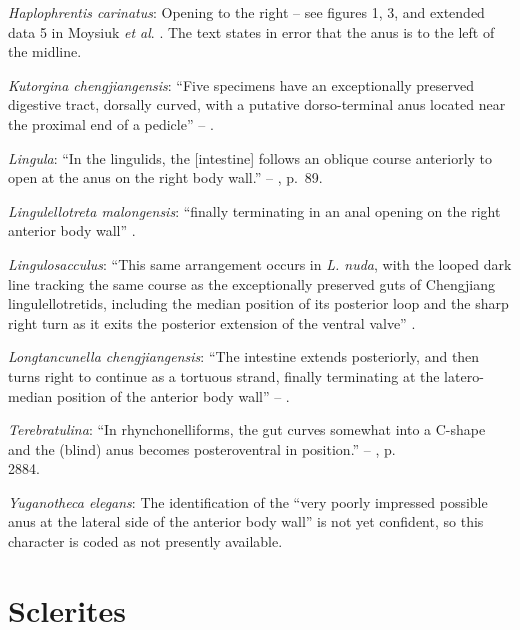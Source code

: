 \documentclass[openany]{book}
\theoremstyle{definition}
\theoremstyle{definition}
\theoremstyle{definition}
\theoremstyle{remark}
\begin{document}
\hypertarget{Haplophrentis_carinatus-coding-62}{}
\emph{Haplophrentis carinatus}: Opening to the right -- see figures 1,
3, and extended data 5 in Moysiuk \emph{et al}.
\citeyearpar{Moysiuk2017Hyolithsare}. The text states in error that the
anus is to the left of the midline.

\hypertarget{Kutorgina_chengjiangensis-coding-62}{}
\emph{Kutorgina chengjiangensis}: ``Five specimens have an exceptionally
preserved digestive tract, dorsally curved, with a putative
dorso-terminal anus located near the proximal end of a pedicle'' --
\citet{Zhang2007Rhynchonelliformeanbrachiopods}.

\hypertarget{Lingula-coding-62}{}
\emph{Lingula}: ``In the lingulids, the {[}intestine{]} follows an
oblique course anteriorly to open at the anus on the right body wall.''
-- \citet{Williams1997Introduction}, p.~89.

\hypertarget{Lingulellotreta_malongensis-coding-62}{}
\emph{Lingulellotreta malongensis}: ``finally terminating in an anal
opening on the right anterior body wall'' \citep[p.66]{Zhang2007Noteon}.

\hypertarget{Lingulosacculus-coding-62}{}
\emph{Lingulosacculus}: ``This same arrangement occurs in \emph{L.
nuda}, with the looped dark line tracking the same course as the
exceptionally preserved guts of Chengjiang lingulellotretids, including
the median position of its posterior loop and the sharp right turn as it
exits the posterior extension of the ventral valve''
\citep[p.310]{Balthasar2009EarlyCambrian}.

\hypertarget{Longtancunella_chengjiangensis-coding-62}{}
\emph{Longtancunella chengjiangensis}: ``The intestine extends
posteriorly, and then turns right to continue as a tortuous strand,
finally terminating at the latero-median position of the anterior body
wall'' -- \citet{Zhang2007Agregarious}.

\hypertarget{Terebratulina-coding-62}{}
\emph{Terebratulina}: ``In rhynchonelliforms, the gut curves somewhat
into a C-shape and the (blind) anus becomes posteroventral in
position.'' -- \citet{Williams2007Supplement}, p.\\
2884.

\hypertarget{Yuganotheca_elegans-coding-62}{}
\emph{Yuganotheca elegans}: The identification of the ``very poorly
impressed possible anus at the lateral side of the anterior body wall''
is not yet confident, so this character is coded as not presently
available.

\section{Sclerites}\label{sclerites}
\end{document}
